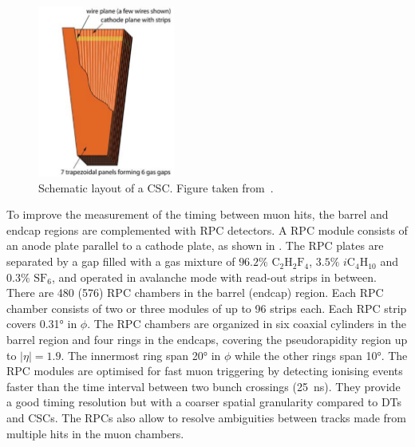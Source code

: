 \begin{figure}[!htbp]
 \begin{center}
  \includegraphics[width=0.4\textwidth]{Figures/Experiment/CMS/CSC.png}
 \end{center}
 \caption{Schematic layout of a CSC. Figure taken from~\cite{CMS}.}
 \label{fig:CMS_CSC}
\end{figure}

To improve the measurement of the timing between muon hits, the barrel and endcap regions are complemented with RPC detectors. A RPC module consists of an anode plate parallel to a cathode plate, as shown in . The  RPC plates are separated by a gap filled with a gas mixture of $96.2\%$ $\mathrm{C}_{2}\mathrm{H}_{2}\mathrm{F}_{4}$, $3.5\%$ $i\mathrm{C}_{4}\mathrm{H}_{10}$ and $0.3\%$ $\mathrm{SF}_{6}$, and operated in avalanche mode with read-out strips in between. There are 480 (576) RPC chambers in the barrel (endcap) region. Each RPC chamber consists of two or three modules of up to 96 strips each. Each RPC strip covers \ang{0.31} in $\phi$. The RPC chambers are organized in six coaxial cylinders in the barrel region and four rings in the endcaps, covering the pseudorapidity region up to $|\eta| = 1.9$. The innermost ring span \ang{20} in $\phi$ while the other rings span \ang{10}. The RPC modules are optimised for fast muon triggering by detecting ionising events faster than the time interval between two bunch crossings (\SI{25}{\ns}). They provide a good timing resolution but with a coarser spatial granularity compared to DTs and CSCs. The RPCs also allow to resolve ambiguities between tracks made from multiple hits in the muon chambers.


